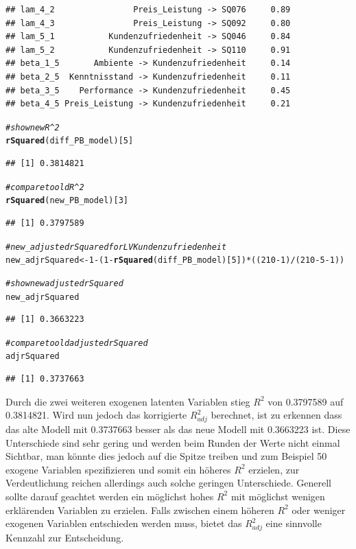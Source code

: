 \documentclass{article}\usepackage[]{graphicx}\usepackage[]{color}
\makeatletter
\newcommand{\hlnum}[1]{\textcolor[rgb]{0.686,0.059,0.569}{#1}}%
\newcommand{\hlcom}[1]{\textcolor[rgb]{0.678,0.584,0.686}{\textit{#1}}}%
\newcommand{\hlopt}[1]{\textcolor[rgb]{0,0,0}{#1}}%
\newcommand{\hlstd}[1]{\textcolor[rgb]{0.345,0.345,0.345}{#1}}%
\newcommand{\hlkwb}[1]{\textcolor[rgb]{0.69,0.353,0.396}{#1}}%
\newcommand{\hlkwd}[1]{\textcolor[rgb]{0.737,0.353,0.396}{\textbf{#1}}}%
\newenvironment{kframe}{%
 \def\at@end@of@kframe{}%
 \ifinner\ifhmode%
  \def\at@end@of@kframe{\end{minipage}}%
  \begin{minipage}{\columnwidth}%
 \fi\fi%
 \def\FrameCommand##1{\hskip\@totalleftmargin \hskip-\fboxsep
 \colorbox{shadecolor}{##1}\hskip-\fboxsep
     \hskip-\linewidth \hskip-\@totalleftmargin \hskip\columnwidth}%
 \MakeFramed {\advance\hsize-\width
   \@totalleftmargin\z@ \linewidth\hsize
   \@setminipage}}%
 {\par\unskip\endMakeFramed%
 \at@end@of@kframe}
\newenvironment{knitrout}{}{} %
\makeatother
\begin{document}
\begin{knitrout}
\begin{kframe}
\begin{verbatim}
## lam_4_2                Preis_Leistung -> SQ076     0.89
## lam_4_3                Preis_Leistung -> SQ092     0.80
## lam_5_1           Kundenzufriedenheit -> SQ046     0.84
## lam_5_2           Kundenzufriedenheit -> SQ110     0.91
## beta_1_5       Ambiente -> Kundenzufriedenheit     0.14
## beta_2_5  Kenntnisstand -> Kundenzufriedenheit     0.11
## beta_3_5    Performance -> Kundenzufriedenheit     0.45
## beta_4_5 Preis_Leistung -> Kundenzufriedenheit     0.21
\end{verbatim}
\begin{alltt}
\hlcom{#show new R^2}
\hlkwd{rSquared}\hlstd{(diff_PB_model)[}\hlnum{5}\hlstd{]}
\end{alltt}
\begin{verbatim}
## [1] 0.3814821
\end{verbatim}
\begin{alltt}
\hlcom{#compare to old R^2}
\hlkwd{rSquared}\hlstd{(new_PB_model)[}\hlnum{3}\hlstd{]}
\end{alltt}
\begin{verbatim}
## [1] 0.3797589
\end{verbatim}
\begin{alltt}
\hlcom{#new_adjusted rSquared for LV Kundenzufriedenheit}
\hlstd{new_adjrSquared} \hlkwb{<-} \hlnum{1}\hlopt{-}\hlstd{(}\hlnum{1}\hlopt{-}\hlkwd{rSquared}\hlstd{(diff_PB_model)[}\hlnum{5}\hlstd{])}\hlopt{*}\hlstd{((}\hlnum{210}\hlopt{-}\hlnum{1}\hlstd{)}\hlopt{/}\hlstd{(}\hlnum{210}\hlopt{-}\hlnum{5}\hlopt{-}\hlnum{1}\hlstd{))}

\hlcom{#show new adjusted rSquared}
\hlstd{new_adjrSquared}
\end{alltt}
\begin{verbatim}
## [1] 0.3663223
\end{verbatim}
\begin{alltt}
\hlcom{#compare to old adjusted rSquared}
\hlstd{adjrSquared}
\end{alltt}
\begin{verbatim}
## [1] 0.3737663
\end{verbatim}
\end{kframe}
\end{knitrout}
Durch die zwei weiteren exogenen latenten Variablen stieg $R^{2}$ von 0.3797589 auf 0.3814821. Wird nun jedoch das korrigierte $R^{2}_{adj}$ berechnet, ist zu erkennen dass das alte Modell mit 0.3737663 besser als das neue Modell mit 0.3663223 ist. Diese Unterschiede sind sehr gering und werden beim Runden der Werte nicht einmal Sichtbar, man könnte dies jedoch auf die Spitze treiben und zum Beispiel 50 exogene Variablen spezifizieren und somit ein höheres $R^{2}$ erzielen, zur Verdeutlichung reichen allerdings auch solche geringen Unterschiede. Generell sollte darauf geachtet werden ein möglichst hohes $R^{2}$ mit möglichst wenigen erklärenden Variablen zu erzielen. Falls zwischen einem höheren $R^{2}$ oder weniger exogenen Variablen entschieden werden muss, bietet das $R^{2}_{adj}$ eine sinnvolle Kennzahl zur Entscheidung.
\end{document}
